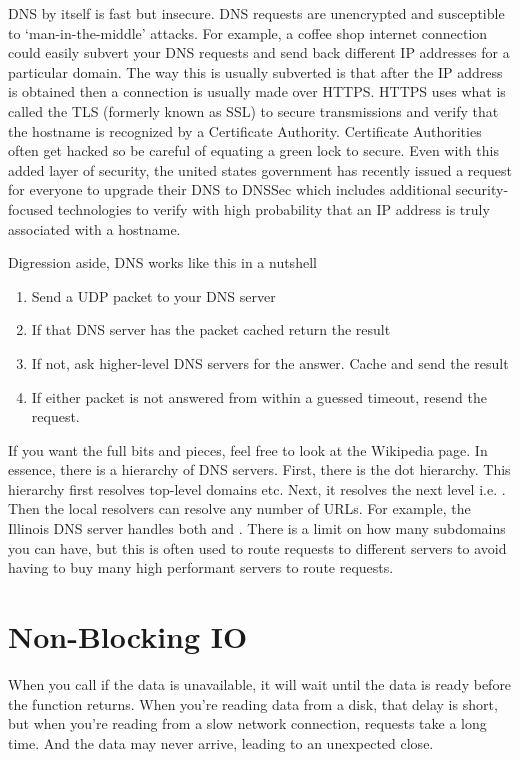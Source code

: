 DNS by itself is fast but insecure.
DNS requests are unencrypted and susceptible to `man-in-the-middle' attacks.
For example, a coffee shop internet connection could easily subvert your DNS requests and send back different IP addresses for a particular domain.
The way this is usually subverted is that after the IP address is obtained then a connection is usually made over HTTPS.
HTTPS uses what is called the TLS (formerly known as SSL) to secure transmissions and verify that the hostname is recognized by a Certificate Authority.
Certificate Authorities often get hacked so be careful of equating a green lock to secure.
Even with this added layer of security, the united states government has recently issued a request for everyone to upgrade their DNS to DNSSec which includes additional security-focused technologies to verify with high probability that an IP address is truly associated with a hostname.

Digression aside, DNS works like this in a nutshell
\begin{enumerate}
\item Send a UDP packet to your DNS server
\item If that DNS server has the packet cached return the result
\item If not, ask higher-level DNS servers for the answer. Cache and send the result
  \item If either packet is not answered from within a guessed timeout, resend the request.
\end{enumerate}

If you want the full bits and pieces, feel free to look at the Wikipedia page.
In essence, there is a hierarchy of DNS servers.
First, there is the dot hierarchy.
This hierarchy first resolves top-level domains   etc.
Next, it resolves the next level i.e. .
Then the local resolvers can resolve any number of URLs.
For example, the Illinois DNS server handles both  and . There is a limit on how many subdomains you can have, but this is often used to route requests to different servers to avoid having to buy many high performant servers to route requests.

\section{Non-Blocking IO}

When you call  if the data is unavailable, it will wait until the data is ready before the function returns.
When you're reading data from a disk, that delay is short, but when you're reading from a slow network connection, requests take a long time.
And the data may never arrive, leading to an unexpected close.

